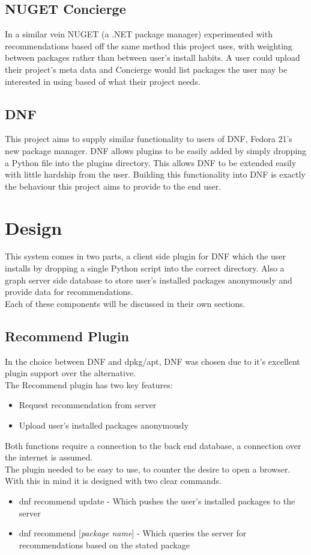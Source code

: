 \documentclass{l4proj}
\begin{document}
\section{NUGET Concierge}
In a similar vein NUGET (a .NET package manager) experimented with recommendations based off the same method this project uses, with weighting between packages rather than between user's install habits. A user could upload their project's meta data and Concierge would list packages the user may be interested in using based of what their project needs.\\

\section{DNF}
This project aims to supply similar functionality to users of DNF, Fedora 21's new package manager. DNF allows plugins to be easily added by simply dropping a Python file into the plugins directory. This allows DNF to be extended easily with little hardship from the user. Building this functionality into DNF is exactly the behaviour this project aims to provide to the end user.\\ 

 
 
\chapter{Design}
This system comes in two parts, a client side plugin for DNF which the user installs by dropping a single Python script into the correct directory. Also a graph server side database to store user's installed packages anonymously and provide data for recommendations.\\
Each of these components will be discussed in their own sections.

\section{Recommend Plugin}
In the choice between DNF and dpkg/apt, DNF was chosen due to it's excellent plugin support over the alternative.\\
The Recommend plugin has two key features:
\begin{itemize}
\item Request recommendation from server
\item Upload user's installed packages anonymously
\end{itemize}
Both functions require a connection to the back end database, a connection over the internet is assumed.\\
The plugin needed to be easy to use, to counter the desire to open a browser. With this in mind it is designed with two clear commands.
\begin{itemize}
\item dnf recommend update - Which pushes the user's installed packages to the server
\item dnf recommend [\textit{package name}] - Which queries the server for recommendations based on the stated package
\end{itemize}
\end{document}
